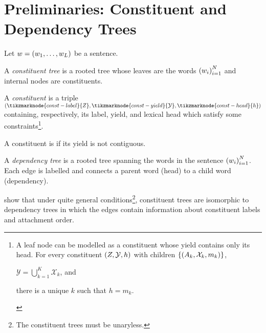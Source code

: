 \documentclass{report}
\theoremstyle{definition}
\theoremstyle{plain}
\theoremstyle{definition}
\theoremstyle{remark}
\numberwithin{equation}{section}
\numberwithin{figure}{section}
\numberwithin{table}{section}
\begin{document}
\setcounter{secnumdepth}{3}

\section{Preliminaries: Constituent and Dependency Trees}
Let \(w = \qty(w_{1}, \ldots, w_{L})\) be a sentence.

A \textit{constituent tree} is a rooted tree whose leaves are the words \(\qty(w_{i})_{i=1}^{N}\) and internal nodes are constituents.

A \textit{constituent} is a triple \(\qty(\tikzmarknode{const-label}{Z}, \tikzmarknode{const-yield}{\mathcal{Y}}, \tikzmarknode{const-head}{h})\) containing, respectively, its label, yield, and lexical head which satisfy some constraints\footnote{A leaf node can be modelled as a constituent whose yield contains only its head. For every constituent \(\qty(Z, \mathcal{Y}, h)\) with children \(\qty{\qty(A_{k}, \mathcal{X}_{k}, m_{k})}\), \begin{enumerate*} \item \(\mathcal{Y} = \bigcup_{k=1}^{K} \mathcal{X}_{k}\), and \item there is a unique \(k\) such that \(h = m_{k}\). \end{enumerate*}}.

A constituent is  if its yield is not contiguous.

A \textit{dependency tree} is a rooted tree spanning the words in the sentence \(\qty(w_{i})_{i=1}^{N}\). Each edge is labelled and connects a parent word (head) to a child word (dependency).

\textcite{fernandez2015parsing} show that under quite general conditions\footnote{The constituent trees must be unaryless.}, constituent trees are isomorphic to dependency trees in which the edges contain information about constituent labels and attachment order.
\end{document}
